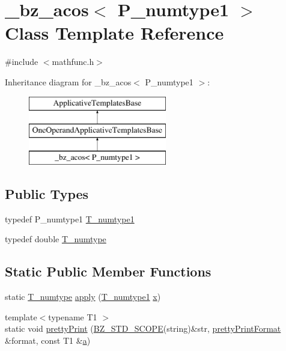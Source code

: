 \hypertarget{class__bz__acos}{}\section{\+\_\+bz\+\_\+acos$<$ P\+\_\+numtype1 $>$ Class Template Reference}
\label{class__bz__acos}


{\ttfamily \#include $<$mathfunc.\+h$>$}

Inheritance diagram for \+\_\+bz\+\_\+acos$<$ P\+\_\+numtype1 $>$\+:\begin{figure}[H]
\begin{center}
\leavevmode
\includegraphics[height=3.000000cm]{class__bz__acos}
\end{center}
\end{figure}
\subsection*{Public Types}
\begin{DoxyCompactItemize}
\item 
typedef P\+\_\+numtype1 \hyperlink{class__bz__acos_aa0c4481ebcfd79e60f6e01e73f8d290e}{T\+\_\+numtype1}
\item 
typedef double \hyperlink{class__bz__acos_ab3cc29800ce7da2b6a357c9c9e5e55d7}{T\+\_\+numtype}
\end{DoxyCompactItemize}
\subsection*{Static Public Member Functions}
\begin{DoxyCompactItemize}
\item 
static \hyperlink{class__bz__acos_ab3cc29800ce7da2b6a357c9c9e5e55d7}{T\+\_\+numtype} \hyperlink{class__bz__acos_a580185e282855432cdc9343058fbb301}{apply} (\hyperlink{class__bz__acos_aa0c4481ebcfd79e60f6e01e73f8d290e}{T\+\_\+numtype1} \hyperlink{vecnorm1_8cc_ac73eed9e41ec09d58f112f06c2d6cb63}{x})
\item 
{\footnotesize template$<$typename T1 $>$ }\\static void \hyperlink{class__bz__acos_a0500d3a8ed8f7c20613a4bce0717ca71}{pretty\+Print} (\hyperlink{numinquire_8h_a2b24ffc3b4ef9803956bc7715c6c7b83}{B\+Z\+\_\+\+S\+T\+D\+\_\+\+S\+C\+O\+P\+E}(string)\&str, \hyperlink{classprettyPrintFormat}{pretty\+Print\+Format} \&format, const T1 \&\hyperlink{gen__mat5files_8m_aae328bf20413f220e38aec4d95bfd6da}{a})
\end{DoxyCompactItemize}


